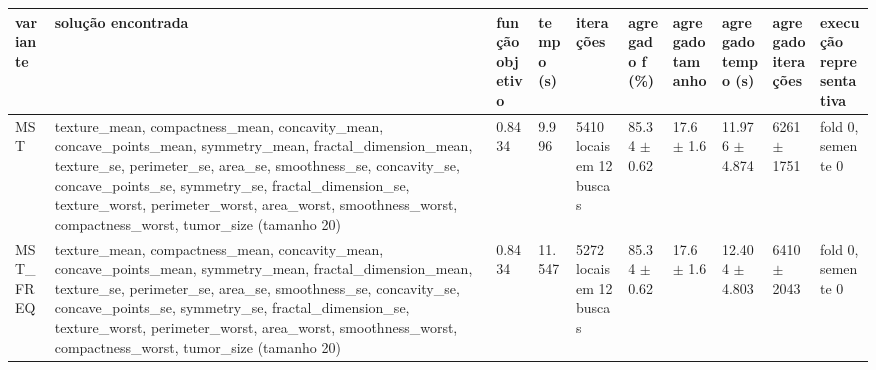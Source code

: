 \begin{tabular}{llllllllll}
\hline
variante & solução encontrada & função objetivo & tempo (s) & iterações & agregado f (\%) & agregado tamanho & agregado tempo (s) & agregado iterações & execução representativa \\
\hline
MST & texture\_mean, compactness\_mean, concavity\_mean, concave\_points\_mean, symmetry\_mean, fractal\_dimension\_mean, texture\_se, perimeter\_se, area\_se, smoothness\_se, concavity\_se, concave\_points\_se, symmetry\_se, fractal\_dimension\_se, texture\_worst, perimeter\_worst, area\_worst, smoothness\_worst, compactness\_worst, tumor\_size (tamanho 20) & 0.8434 & 9.996 & 5410 locais em 12 buscas & 85.34 $\pm$ 0.62 & 17.6 $\pm$ 1.6 & 11.976 $\pm$ 4.874 & 6261 $\pm$ 1751 & fold 0, semente 0 \\
MST\_FREQ & texture\_mean, compactness\_mean, concavity\_mean, concave\_points\_mean, symmetry\_mean, fractal\_dimension\_mean, texture\_se, perimeter\_se, area\_se, smoothness\_se, concavity\_se, concave\_points\_se, symmetry\_se, fractal\_dimension\_se, texture\_worst, perimeter\_worst, area\_worst, smoothness\_worst, compactness\_worst, tumor\_size (tamanho 20) & 0.8434 & 11.547 & 5272 locais em 12 buscas & 85.34 $\pm$ 0.62 & 17.6 $\pm$ 1.6 & 12.404 $\pm$ 4.803 & 6410 $\pm$ 2043 & fold 0, semente 0 \\
\hline
\end{tabular}
